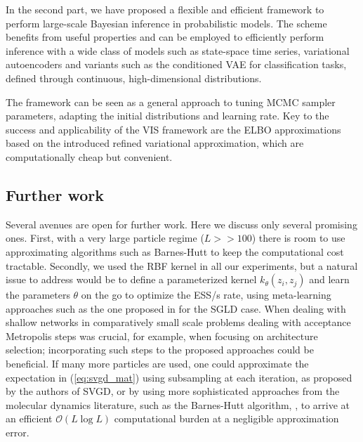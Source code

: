 In the second part, we have proposed a flexible and efficient framework to perform
large-scale Bayesian inference in probabilistic models. The scheme benefits from useful properties and can be 
employed to efficiently perform inference with a wide class of models such as state-space time series, variational autoencoders {and variants such as the conditioned VAE for classification tasks}, defined through continuous, high-dimensional distributions.

The framework can be seen as a general 
approach to tuning MCMC sampler parameters, adapting the initial distributions and learning rate. %
Key to the success and applicability of the VIS framework are the ELBO approximations based on the introduced refined variational approximation, which are computationally cheap but convenient. 

\subsection{Further work}

Several avenues are open for further work. Here we discuss only several promising ones. First, with a very large particle regime ($L >> 100$) there is room to use approximating algorithms such as Barnes-Hutt to keep the computational cost tractable.
Secondly, we used the RBF kernel in all our experiments, but a natural 
issue to address would be to define a parameterized kernel $k_{\theta} (z_i, z_j)$ and learn the parameters $\theta$ on the go to optimize the ESS/s rate, using meta-learning approaches such as the one proposed in \parencite{gallego2019vis} for the SGLD case.
When dealing with shallow networks in comparatively small scale problems
\parencite{muller1998issues} dealing with acceptance Metropolis steps was crucial, for example,
when focusing on architecture selection; incorporating such steps
to the proposed approaches could be beneficial. 
If many more particles are  used, one could approximate the expectation in (\ref{eq:svgd_mat}) using subsampling at each iteration, as proposed by the authors of SVGD, or by using more sophisticated approaches from the molecular dynamics literature, such as the Barnes-Hutt algorithm, \parencite{barnes1986hierarchical}, to arrive at an efficient $\mathcal{O}(L \log L)$ computational burden at a negligible approximation error.

